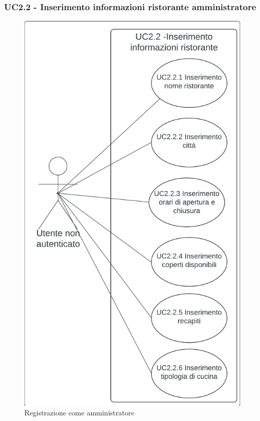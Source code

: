 \subsubsection{UC2.2 - Inserimento informazioni ristorante amministratore}\label{usecase:2_2}

\begin{figure}[H]
    \centering
    \includegraphics[scale=0.7]{ucd/UCD2.2_finale.png}
\caption{Registrazione come amministratore}
\end{figure}

